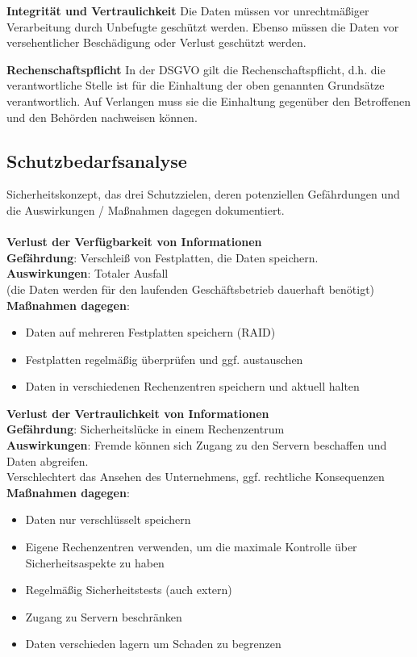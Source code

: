 \documentclass[10pt]{article}
\begin{document}
\textbf{Integrität und Vertraulichkeit} 
Die Daten müssen vor unrechtmäßiger Verarbeitung durch Unbefugte geschützt werden. Ebenso müssen die Daten vor versehentlicher Beschädigung oder Verlust geschützt werden.

\textbf{Rechenschaftspflicht}
In der DSGVO gilt die Rechenschaftspflicht, d.h. die verantwortliche Stelle ist für die Einhaltung der oben genannten Grundsätze verantwortlich. Auf Verlangen muss sie die Einhaltung gegenüber den Betroffenen und den Behörden nachweisen können.

\subsection{Schutzbedarfsanalyse}

Sicherheitskonzept, das drei Schutzzielen, deren potenziellen Gefährdungen und die Auswirkungen / Maßnahmen dagegen dokumentiert. \\
\\
\textbf{Verlust der Verfügbarkeit von Informationen} \\
\textbf{Gefährdung}: Verschleiß von Festplatten, die Daten speichern.\\
\textbf{Auswirkungen}: Totaler Ausfall \\ (die Daten werden für den laufenden Geschäftsbetrieb dauerhaft benötigt) \\
\textbf{Maßnahmen dagegen}: 
\begin{itemize}
\item Daten auf mehreren Festplatten speichern (RAID)
\item Festplatten regelmäßig überprüfen und ggf. austauschen
\item Daten in verschiedenen Rechenzentren speichern und aktuell halten
\end{itemize}
\vspace{1cm}
\textbf{Verlust der Vertraulichkeit von Informationen} \\
\textbf{Gefährdung}: Sicherheitslücke in einem Rechenzentrum \\
\textbf{Auswirkungen}: Fremde können sich Zugang zu den Servern beschaffen und Daten abgreifen. \\
Verschlechtert das Ansehen des Unternehmens, ggf. rechtliche Konsequenzen \\
\textbf{Maßnahmen dagegen}: 
\begin{itemize}
\item Daten nur verschlüsselt speichern
\item Eigene Rechenzentren verwenden, um die maximale Kontrolle über Sicherheitsaspekte zu haben
\item Regelmäßig Sicherheitstests (auch extern)
\item Zugang zu Servern beschränken
\item Daten verschieden lagern um Schaden zu begrenzen
\end{itemize}
\end{document}
